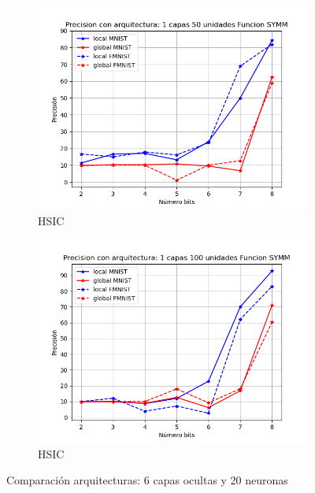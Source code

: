 \begin{figure}[H]
\begin{subfigure}[H]{0.475\textwidth}
    \includegraphics[width=\textwidth]{imagenes/HSIC/Precision con arquitectura: 1 capas 50 unidades Funcion SYMM.png}
    \caption{HSIC}
    \end{subfigure}
    \begin{subfigure}[H]{0.475\textwidth}
    \includegraphics[width=\textwidth]{imagenes/HSIC/Precision con arquitectura: 1 capas 100 unidades Funcion SYMM.png}
    \caption{HSIC}
    \end{subfigure}
    \caption{Comparación arquitecturas: 6 capas ocultas y 20 neuronas}
\end{figure}

